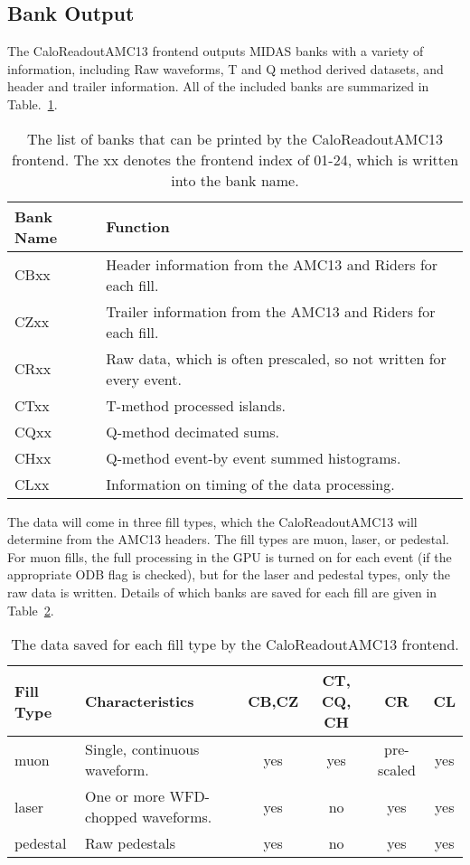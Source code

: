 \subsection{Bank Output}

The CaloReadoutAMC13 frontend outputs MIDAS banks with a variety of information, including Raw waveforms, T and Q method derived datasets, and header and trailer information. All of the included banks are summarized in Table.~\ref{tab:banks}. 

\begin{table}
\begin{tabular}{|l|l|}
\hline
Bank Name & Function\\
\hline
CBxx & Header information from the AMC13 and Riders for each fill.\\
CZxx & Trailer information from the AMC13 and Riders for each fill.\\
CRxx & Raw data, which is often prescaled, so not written for every event.\\
CTxx & T-method processed islands.\\
CQxx & Q-method decimated sums.\\
CHxx & Q-method event-by event summed histograms.\\
CLxx & Information on timing of the data processing.\\
\hline
\end{tabular}
\caption{\label{tab:banks}The list of banks that can be printed by the CaloReadoutAMC13 frontend. The xx denotes the frontend index of 01-24, which is written into the bank name.}
\end{table}

The data will come in three fill types, which the CaloReadoutAMC13 will determine from the AMC13 headers. The fill types are muon, laser, or pedestal. For muon fills, the full processing in the GPU is turned on for each event (if the appropriate ODB flag is checked), but for the laser and pedestal types, only the raw data is written. Details of which banks are saved for each fill are given in Table~\ref{tab:fills}.

\begin{table}
\begin{tabular}{|l|l|c|c|c|c|}
\hline
Fill Type & Characteristics & CB,CZ & CT, CQ, CH & CR & CL\\
\hline
muon & Single, continuous waveform. & yes & yes & pre-scaled & yes\\
\hline
laser & \multicolumn{1}{m{5cm}|}{One or more WFD-chopped waveforms.} & yes & no & yes & yes\\
\hline
pedestal & \multicolumn{1}{m{3cm}|}{Raw pedestals} & yes & no & yes & yes\\
\hline
\end{tabular}
\caption{\label{tab:fills}The data saved for each fill type by the CaloReadoutAMC13 frontend.}
\end{table}

